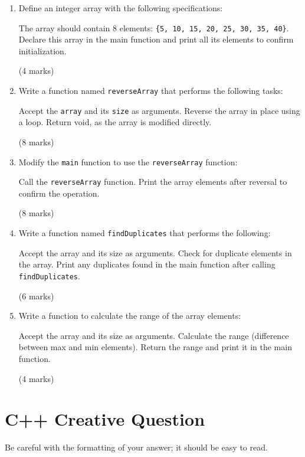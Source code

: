 \documentclass[a4paper,12pt]{article}
\begin{document}
\begin{enumerate}
    \item Define an integer array with the following specifications:

    The array should contain 8 elements: \verb|{5, 10, 15, 20, 25, 30, 35, 40}|.
    Declare this array in the main function and print all its elements to confirm initialization.

    (4 marks)

    \item Write a function named \verb|reverseArray| that performs the following tasks:

    Accept the \verb|array| and its \verb|size| as arguments.
    Reverse the array in place using a loop.
    Return void, as the array is modified directly.

    (8 marks)

    \item Modify the \verb|main| function to use the \verb|reverseArray| function:

    Call the \verb|reverseArray| function.
    Print the array elements after reversal to confirm the operation.

    (8 marks)

    \item Write a function named \verb|findDuplicates| that performs the following:

    Accept the array and its size as arguments.
    Check for duplicate elements in the array.
    Print any duplicates found in the main function after calling \verb|findDuplicates|.

    (6 marks)

    \item Write a function to calculate the range of the array elements:

    Accept the array and its size as arguments.
    Calculate the range (difference between max and min elements).
    Return the range and print it in the main function.

    (4 marks)
\end{enumerate}

\section{C++ Creative Question}

Be careful with the formatting of your answer; it should be easy to read.
\end{document}
